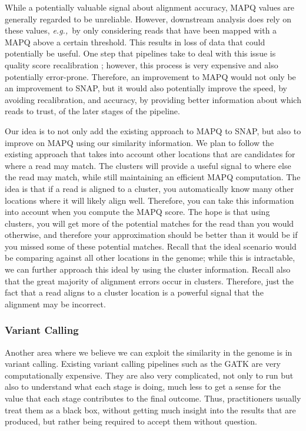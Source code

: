 \documentclass[twocolumn,10pt]{article}
\newcommand{\eg}{{\em e.g.,}~}
\begin{document}
While a potentially valuable signal about alignment accuracy, MAPQ values are generally regarded to be unreliable.  However, downstream analysis does rely on these values, \eg by only considering reads that have been mapped with a MAPQ above a certain threshold.  This results in loss of data that could potentially be useful.  One step that pipelines take to deal with this issue is quality score recalibration \cite{DePristo:2011}; however, this process is very expensive and also potentially error-prone.  Therefore, an improvement to MAPQ would not only be an improvement to SNAP, but it would also potentially improve the speed, by avoiding recalibration, and accuracy, by providing better information about which reads to trust, of the later stages of the pipeline.

Our idea is to not only add the existing approach to MAPQ to SNAP, but also to improve on MAPQ using our similarity information.  We plan to follow the existing approach that takes into account other locations that are candidates for where a read may match.  The clusters will provide a useful signal to where else the read may match, while still maintaining an efficient MAPQ computation.  The idea is that if a read is aligned to a cluster, you automatically know many other locations where it will likely align well.  Therefore, you can take this information into account when you compute the MAPQ score.  The hope is that using clusters, you will get more of the potential matches for the read than you would otherwise, and therefore your approximation should be better than it would be if you missed some of these potential matches.  Recall that the ideal scenario would be comparing against all other locations in the genome; while this is intractable, we can further approach this ideal by using the cluster information.  Recall also that the great majority of alignment errors occur in clusters.  Therefore, just the fact that a read aligns to a cluster location is a powerful signal that the alignment may be incorrect.

\subsubsection{Variant Calling}

Another area where we believe we can exploit the similarity in the genome is in variant calling.  Existing variant calling pipelines such as the GATK \cite{DePristo:2011} are very computationally expensive.  They are also very complicated, not only to run but also to understand what each stage is doing, much less to get a sense for the value that each stage contributes to the final outcome.  Thus, practitioners usually treat them as a black box, without getting much insight into the results that are produced, but rather being required to accept them without question.
\end{document}

